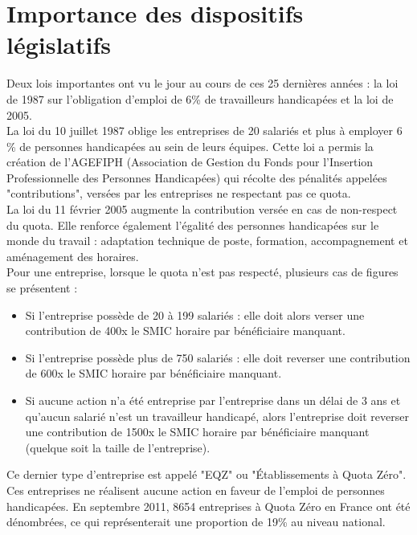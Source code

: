\section{Importance des dispositifs législatifs}
Deux lois importantes ont vu le jour au cours de ces 25 dernières années : la loi de 1987 sur l'obligation d'emploi de 6\% de travailleurs handicapées et la loi de 2005.\\

La loi du 10 juillet 1987 oblige les entreprises de 20 salariés et plus à employer 6 \% de personnes handicapées au sein de leurs équipes. Cette loi a permis la création de l'AGEFIPH (Association de Gestion du Fonds pour l'Insertion Professionnelle des Personnes Handicapées) qui récolte des pénalités appelées "contributions", versées par les entreprises ne respectant pas ce quota.\\

La loi du 11 février 2005 augmente la contribution versée en cas de non-respect du quota. Elle renforce également l'égalité des personnes handicapées sur le monde du travail : adaptation technique de poste, formation, accompagnement et aménagement des horaires.\\

Pour une entreprise, lorsque le quota n'est pas respecté, plusieurs cas de figures se présentent :
\begin{itemize}
\item Si l'entreprise possède de 20 à 199 salariés : elle doit alors verser une contribution de 400x le SMIC horaire par bénéficiaire manquant.
\item Si l'entreprise possède plus de 750 salariés : elle doit reverser une contribution de 600x le SMIC horaire par bénéficiaire manquant.
\item Si aucune action n'a été entreprise par l'entreprise dans un délai de 3 ans et qu'aucun salarié n'est un travailleur handicapé, alors l'entreprise doit reverser une contribution de 1500x le SMIC horaire par bénéficiaire manquant (quelque soit la taille de l'entreprise).\\
\end{itemize}

Ce dernier type d'entreprise est appelé "EQZ" ou "Établissements à Quota Zéro". Ces entreprises ne réalisent aucune action en faveur de l'emploi de personnes handicapées. En septembre 2011, 8654 entreprises à Quota Zéro en France ont été dénombrées, ce qui représenterait une proportion de 19\% au niveau national.

